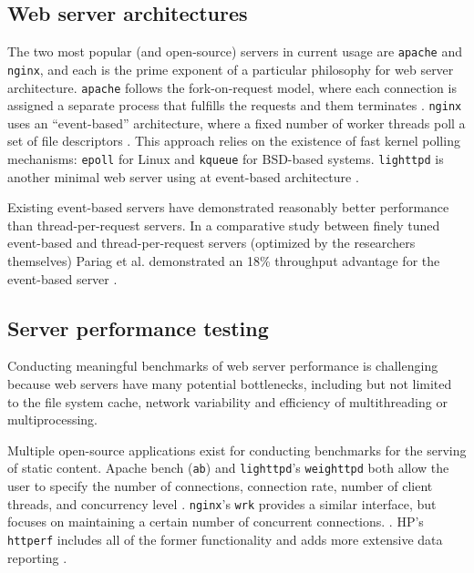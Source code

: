 \documentclass[twoside,10pt]{article}
\begin{document}
\begin{multicols}{2}
\subsection{Web server architectures}

The two most popular (and open-source) servers in current usage are
\verb+apache+ and \verb+nginx+, and each is the prime exponent of a
particular philosophy for web server architecture. \verb+apache+
follows the fork-on-request model, where each connection is assigned a
separate process that fulfills the requests and them terminates
\cite{fielding1997apache}. \verb+nginx+ uses an ``event-based''
architecture, where a fixed number of worker threads poll a set of
file descriptors \cite{syosevnginx}. This approach relies on the
existence of fast kernel polling mechanisms: \verb+epoll+ for Linux
and \verb+kqueue+ for BSD-based systems. \verb+lighttpd+ is another
minimal web server using at event-based architecture
\cite{kneschke2003lighttpd}.

Existing event-based servers have demonstrated reasonably better
performance than thread-per-request servers. In a comparative study
between finely tuned event-based and thread-per-request servers
(optimized by the researchers themselves) Pariag et al. demonstrated
an 18\% throughput advantage for the event-based server
\cite{pariag2007comparing}.

\subsection{Server performance testing}

Conducting meaningful benchmarks of web server performance is
challenging because web servers have many potential bottlenecks,
including but not limited to the file system cache, network
variability and efficiency of multithreading or multiprocessing.

Multiple open-source applications exist for conducting benchmarks for
the serving of static content. Apache bench (\verb+ab+) and
\verb+lighttpd+'s \verb+weighttpd+ both allow the user to specify the
number of connections, connection rate, number of client threads, and
concurrency level
\cite{fielding1997apache,kneschke2003lighttpd}. \verb+nginx+'s
\verb+wrk+ provides a similar interface, but focuses on maintaining a
certain number of concurrent connections. \cite{syosevnginx}. HP's
\verb+httperf+ includes all of the former functionality and adds more
extensive data reporting \cite{mosberger1998httperf}.


\end{multicols}
\end{document}
